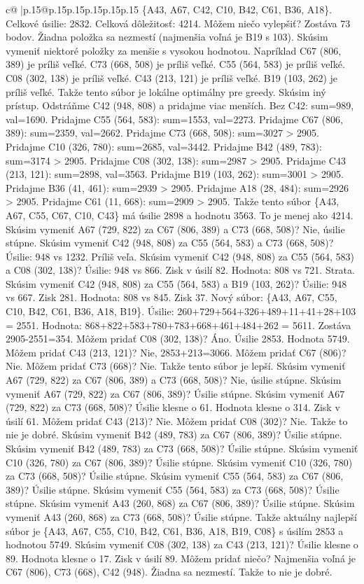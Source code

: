 \documentclass{article}
\begin{document}
{\begin{supertabular}{c@{$\;$}|p{.15\linewidth}@{}p{.15\linewidth}p{.15\linewidth}p{.15\linewidth}p{.15\linewidth}p{.15\linewidth}}
{{{\{A43, A67, C42, C10, B42, C61, B36, A18\}. Celkové úsilie: 2832. Celková dôležitosť: 4214. Môžem niečo vylepšiť? Zostáva 73 bodov. Žiadna položka sa nezmestí (najmenšia voľná je B19 s 103). Skúsim vymeniť niektoré položky za menšie s vysokou hodnotou. Napríklad C67 (806, 389) je príliš veľké. C73 (668, 508) je príliš veľké. C55 (564, 583) je príliš veľké. C08 (302, 138) je príliš veľké. C43 (213, 121) je príliš veľké. B19 (103, 262) je príliš veľké. Takže tento súbor je lokálne optimálny pre greedy. Skúsim iný prístup. Odstráňme C42 (948, 808) a pridajme viac menších. Bez C42: sum=989, val=1690. Pridajme C55 (564, 583): sum=1553, val=2273. Pridajme C67 (806, 389): sum=2359, val=2662. Pridajme C73 (668, 508): sum=3027 > 2905. Pridajme C10 (326, 780): sum=2685, val=3442. Pridajme B42 (489, 783): sum=3174 > 2905. Pridajme C08 (302, 138): sum=2987 > 2905. Pridajme C43 (213, 121): sum=2898, val=3563. Pridajme B19 (103, 262): sum=3001 > 2905. Pridajme B36 (41, 461): sum=2939 > 2905. Pridajme A18 (28, 484): sum=2926 > 2905. Pridajme C61 (11, 668): sum=2909 > 2905. Takže tento súbor \{A43, A67, C55, C67, C10, C43\} má úsilie 2898 a hodnotu 3563. To je menej ako 4214. Skúsim vymeniť A67 (729, 822) za C67 (806, 389) a C73 (668, 508)? Nie, úsilie stúpne. Skúsim vymeniť C42 (948, 808) za C55 (564, 583) a C73 (668, 508)? Úsilie: 948 vs 1232. Príliš veľa. Skúsim vymeniť C42 (948, 808) za C55 (564, 583) a C08 (302, 138)? Úsilie: 948 vs 866. Zisk v úsilí 82. Hodnota: 808 vs 721. Strata. Skúsim vymeniť C42 (948, 808) za C55 (564, 583) a B19 (103, 262)? Úsilie: 948 vs 667. Zisk 281. Hodnota: 808 vs 845. Zisk 37. Nový súbor: \{A43, A67, C55, C10, B42, C61, B36, A18, B19\}. Úsilie: 260+729+564+326+489+11+41+28+103 = 2551. Hodnota: 868+822+583+780+783+668+461+484+262 = 5611. Zostáva 2905{-}2551=354. Môžem pridať C08 (302, 138)? Áno. Úsilie 2853. Hodnota 5749. Môžem pridať C43 (213, 121)? Nie, 2853+213=3066. Môžem pridať C67 (806)? Nie. Môžem pridať C73 (668)? Nie. Takže tento súbor je lepší. Skúsim vymeniť A67 (729, 822) za C67 (806, 389) a C73 (668, 508)? Nie, úsilie stúpne. Skúsim vymeniť A67 (729, 822) za C67 (806, 389)? Úsilie stúpne. Skúsim vymeniť A67 (729, 822) za C73 (668, 508)? Úsilie klesne o 61. Hodnota klesne o 314. Zisk v úsilí 61. Môžem pridať C43 (213)? Nie. Môžem pridať C08 (302)? Nie. Takže to nie je dobré. Skúsim vymeniť B42 (489, 783) za C67 (806, 389)? Úsilie stúpne. Skúsim vymeniť B42 (489, 783) za C73 (668, 508)? Úsilie stúpne. Skúsim vymeniť C10 (326, 780) za C67 (806, 389)? Úsilie stúpne. Skúsim vymeniť C10 (326, 780) za C73 (668, 508)? Úsilie stúpne. Skúsim vymeniť C55 (564, 583) za C67 (806, 389)? Úsilie stúpne. Skúsim vymeniť C55 (564, 583) za C73 (668, 508)? Úsilie stúpne. Skúsim vymeniť A43 (260, 868) za C67 (806, 389)? Úsilie stúpne. Skúsim vymeniť A43 (260, 868) za C73 (668, 508)? Úsilie stúpne. Takže aktuálny najlepší súbor je \{A43, A67, C55, C10, B42, C61, B36, A18, B19, C08\} s úsilím 2853 a hodnotou 5749. Skúsim vymeniť C08 (302, 138) za C43 (213, 121)? Úsilie klesne o 89. Hodnota klesne o 17. Zisk v úsilí 89. Môžem pridať niečo? Najmenšia voľná je C67 (806), C73 (668), C42 (948). Žiadna sa nezmestí. Takže to nie je dobré. }}}
\end{supertabular}}
\end{document}
